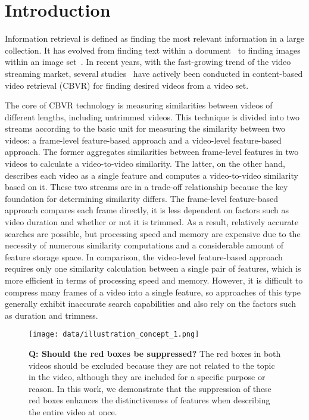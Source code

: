 \documentclass[10pt,twocolumn,letterpaper]{article}
\begin{document}
\section{Introduction}
    Information retrieval is defined as finding the most relevant information in a large collection. It has evolved from finding text within a document~\cite{griffiths1986using, strzalkowski1995natural, bellot1999clustering, liu2004cluster} to finding images within an image set~\cite{arandjelovic2016netvlad, tolias2016particular, jun2019combination, ko2019benchmark, ko2020embedding, gu2020symmetrical}. In recent years, with the fast-growing trend of the video streaming market, several studies~\cite{kordopatis2017near, kordopatis2019visil, shao2021temporal, jo2022exploring, ng2022vrag} have actively been conducted in content-based video retrieval (CBVR) for finding desired videos from a video set.

    The core of CBVR technology is measuring similarities between videos of different lengths, including untrimmed videos. This technique is divided into two streams according to the basic unit for measuring the similarity between two videos: a frame-level feature-based approach and a video-level feature-based approach. The former aggregates similarities between frame-level features in two videos to calculate a video-to-video similarity. The latter, on the other hand, describes each video as a single feature and computes a video-to-video similarity based on it. These two streams are in a trade-off relationship because the key foundation for determining similarity differs. The frame-level feature-based approach compares each frame directly, it is less dependent on factors such as video duration and whether or not it is trimmed. As a result, relatively accurate searches are possible, but processing speed and memory are expensive due to the necessity of numerous similarity computations and a considerable amount of feature storage space. In comparison, the video-level feature-based approach requires only one similarity calculation between a single pair of features, which is more efficient in terms of processing speed and memory. However, it is difficult to compress many frames of a video into a single feature, so approaches of this type generally exhibit inaccurate search capabilities and also rely on the factors such as duration and trimness.

    \begin{figure}[t!]
        \centering
        \texttt{[image: data/illustration\_concept\_1.png]} 
        \vspace{-3mm}
        \caption{\textbf{Q: Should the red boxes be suppressed?} The red boxes in both videos should be excluded because they are not related to the topic in the video, although they are included for a specific purpose or reason. In this work, we demonstrate that the suppression of these red boxes enhances the distinctiveness of features when describing the entire video at once. \vspace{-4mm}} \label{fig:fig1}
    \end{figure}
   
\end{document}
